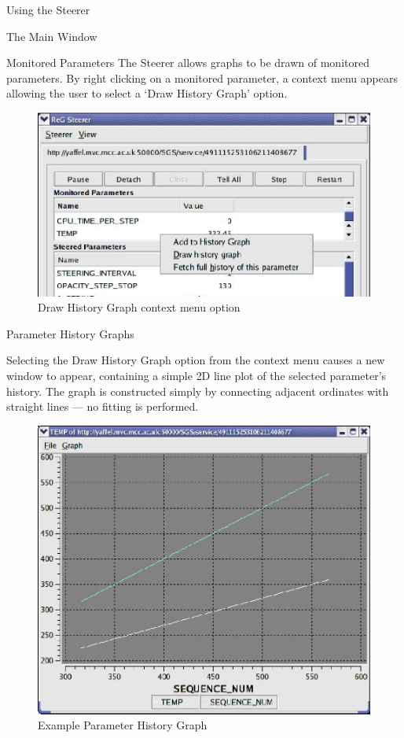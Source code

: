 \documentclass[a4paper,twoside]{article}
\begin{document}
\begin{section}{Using the Steerer}
\begin{subsection}{The Main Window}
\begin{subsubsection}{Monitored Parameters}
The Steerer allows graphs to be drawn of monitored parameters. By
right clicking on a monitored parameter, a context menu appears
allowing the user to select a `Draw History Graph' option.

\begin{figure}
\centerline{\includegraphics{hist_plot_context_menu.eps}}
\caption{Draw History Graph context menu option}
\label{fig:hist_graph_context_menu}
\end{figure}

\end{subsubsection} %

\begin{subsubsection}{Parameter History Graphs}
\label{sec:hist_graphs}

Selecting the Draw History Graph option from the context menu causes a
new window to appear, containing a simple 2D line plot of the selected
parameter's history.  The graph is constructed simply by connecting
adjacent ordinates with straight lines --- no fitting is performed.

\begin{figure}
\centerline{\includegraphics{hist_plot_2curves.eps}}
\caption{Example Parameter History Graph}
\label{fig:eg_param_hist_plot}
\end{figure}


\end{subsubsection}
\end{subsection}
\end{section}
\end{document}
